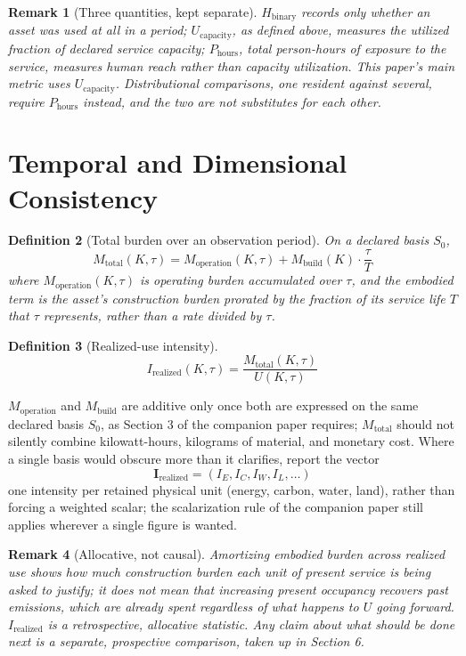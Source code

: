 \documentclass[11pt]{article}
\newtheorem{definition}{Definition}[section]
\newtheorem{remark}[definition]{Remark}
\begin{document}
\begin{remark}[Three quantities, kept separate]
$H_{\text{binary}}$ records only whether an asset was used at all in a period; $U_{\text{capacity}}$, as defined above, measures the utilized fraction of declared service capacity; $P_{\text{hours}}$, total person-hours of exposure to the service, measures human reach rather than capacity utilization. This paper's main metric uses $U_{\text{capacity}}$. Distributional comparisons, one resident against several, require $P_{\text{hours}}$ instead, and the two are not substitutes for each other.
\end{remark}

\section{Temporal and Dimensional Consistency}

\begin{definition}[Total burden over an observation period]
On a declared basis $S_0$,
\[
M_{\text{total}}(K,\tau) = M_{\text{operation}}(K,\tau) + M_{\text{build}}(K)\cdot\frac{\tau}{T}
\]
where $M_{\text{operation}}(K,\tau)$ is operating burden accumulated over $\tau$, and the embodied term is the asset's construction burden prorated by the fraction of its service life $T$ that $\tau$ represents, rather than a rate divided by $\tau$.
\end{definition}

\begin{definition}[Realized-use intensity]
\[
I_{\text{realized}}(K,\tau) = \frac{M_{\text{total}}(K,\tau)}{U(K,\tau)}
\]
\end{definition}

$M_{\text{operation}}$ and $M_{\text{build}}$ are additive only once both are expressed on the same declared basis $S_0$, as Section 3 of the companion paper requires; $M_{\text{total}}$ should not silently combine kilowatt-hours, kilograms of material, and monetary cost. Where a single basis would obscure more than it clarifies, report the vector
\[
\mathbf{I}_{\text{realized}} = (I_E, I_C, I_W, I_L, \dots)
\]
one intensity per retained physical unit (energy, carbon, water, land), rather than forcing a weighted scalar; the scalarization rule of the companion paper still applies wherever a single figure is wanted.

\begin{remark}[Allocative, not causal]
Amortizing embodied burden across realized use shows how much construction burden each unit of present service is being asked to justify; it does not mean that increasing present occupancy recovers past emissions, which are already spent regardless of what happens to $U$ going forward. $I_{\text{realized}}$ is a retrospective, allocative statistic. Any claim about what should be done next is a separate, prospective comparison, taken up in Section 6.
\end{remark}
\end{document}
